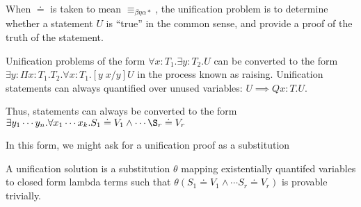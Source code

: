 When $\doteq$ is taken to mean $\equiv_{\beta\eta\alpha*}$, the unification problem is to determine 
whether a statement $U$ is ``true'' in the common sense, and provide a proof of the truth of the statement. 

Unification problems of the form 
$\forall x : T_1 . \exists y : T_2 . U $ can be converted to the form
$\exists y : \Pi x : T_1 . T_2 . \forall x : T_1 . [y\;x / y ]U $ in the process known as raising. Unification
statements can always quantified over unused variables: $U \implies Q x : T . U$.  

Thus, statements can always be converted to the form
$\exists y_1 \cdots y_n . \forall x_1 \cdots x_k . S_1 \doteq V_1 \wedge \cdots \S_r \doteq V_r$

In this form, we might ask for a unification proof as a substitution

\begin{definition}
A unification solution is a substitution $\theta$ 
mapping existentially quantifed
variables to closed form lambda terms such 
that $\theta (S_1 \doteq V_1 \wedge \cdots S_r \doteq V_r)$
is provable trivially. 
\end{definition}

